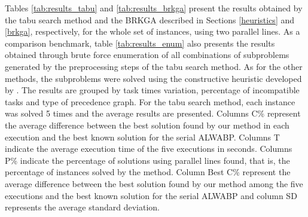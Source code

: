 \documentclass{singlecol-new}
\begin{document}
Tables \ref{tab:results_tabu} and \ref{tab:results_brkga} present the results obtained by the tabu search method and the BRKGA described in Sections \ref{heuristics} and \ref{brkga}, respectively, for the whole set of instances, using two parallel lines. As a comparison benchmark, table \ref{tab:results_enum} also presents the results obtained through brute force enumeration of all combinations of subproblems generated by the preprocessing steps of the tabu search method. As for the other methods, the subproblems were solved using the constructive heuristic developed by \cite{moreira12simple}. The results are grouped by task times variation, percentage of incompatible tasks and type of precedence graph. For the tabu search method, each instance was solved 5 times and the average results are presented. Columns C\% represent the average difference between the best solution found by our method in each execution and the best known solution for the serial ALWABP. Columns T indicate the average execution time of the five executions in seconds. Columns P\% indicate the percentage of solutions using parallel lines found, that is, the percentage of instances solved by the method. Column Best C\% represent the average difference between the best solution found by our method among the five executions and the best known solution for the serial ALWABP and column SD represents the average standard deviation.
\end{document}
